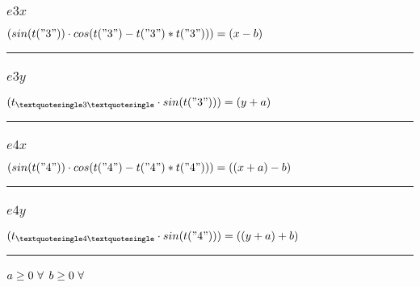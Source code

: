 \documentclass[11pt]{article}
\begin{document}
\subsubsection*{$e3x$}
$
(sin(t("3")) \cdot cos(t("3") - t("3") * t("3"))) = (x - b)
$
\vspace{5pt}
\hrule
\subsubsection*{$e3y$}
$
(t_{\textquotesingle 3 \textquotesingle} \cdot sin(t("3"))) = (y + a)
$
\vspace{5pt}
\hrule
\subsubsection*{$e4x$}
$
(sin(t("4")) \cdot cos(t("4") - t("4") * t("4"))) = ((x + a) - b)
$
\vspace{5pt}
\hrule
\subsubsection*{$e4y$}
$
(t_{\textquotesingle 4 \textquotesingle} \cdot sin(t("4"))) = ((y + a) + b)
$
\vspace{5pt}
\hrule
\bigskip
$a\geq 0 ~ \forall \\$
$b\geq 0 ~ \forall \\$
\end{document}
